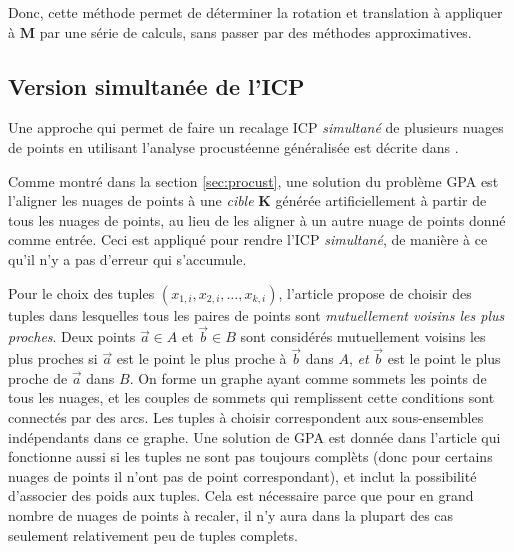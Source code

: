 \documentclass[a4paper,10pt]{scrreprt}
\begin{document}
Donc, cette méthode permet de déterminer la rotation et translation à appliquer à $\mathbf{M}$ par une série de calculs, sans passer par des méthodes approximatives.


\subsection{Version simultanée de l'ICP}
Une approche qui permet de faire un recalage ICP \emph{simultané} de plusieurs nuages de points en utilisant l'analyse procustéenne généralisée est décrite dans \cite{Told2010}.

Comme montré dans la section \ref{sec:procust}, une solution du problème GPA est l'aligner les nuages de points à une \emph{cible} $\mathbf{K}$ générée artificiellement à partir de tous les nuages de points, au lieu de les aligner à un autre nuage de points donné comme entrée. Ceci est appliqué pour rendre l'ICP \emph{simultané}, de manière à ce qu'il n'y a pas d'erreur qui s'accumule.

Pour le choix des tuples ${(x_{1,i}, x_{2,i}, \ldots, x_{k,i})}$, l'article propose de choisir des tuples dans lesquelles tous les paires de points sont \emph{mutuellement voisins les plus proches}. Deux points $\vec{a} \in A$ et $\vec{b} \in B$ sont considérés mutuellement voisins les plus proches si $\vec{a}$ est le point le plus proche à $\vec{b}$ dans $A$, \emph{et} $\vec{b}$ est le point le plus proche de $\vec{a}$ dans $B$. On forme un graphe ayant comme sommets les points de tous les nuages, et les couples de sommets qui remplissent cette conditions sont connectés par des arcs. Les tuples à choisir correspondent aux sous-ensembles indépendants dans ce graphe. Une solution de GPA est donnée dans l'article qui fonctionne aussi si les tuples ne sont pas toujours complèts (donc pour certains nuages de points il n'ont pas de point correspondant), et inclut la possibilité d'associer des poids aux tuples. Cela est nécessaire parce que pour en grand nombre de nuages de points à recaler, il n'y aura dans la plupart des cas seulement relativement peu de tuples complets.
\end{document}
